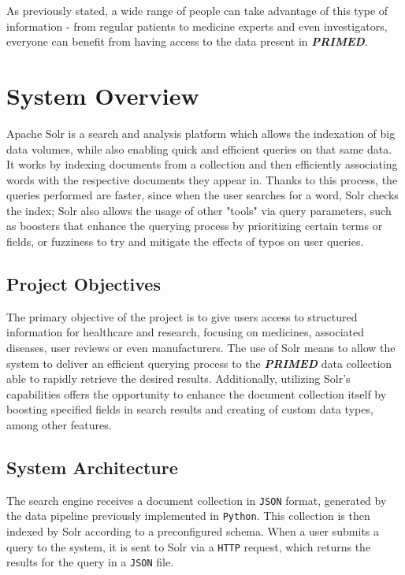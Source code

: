 \documentclass[sigconf]{acmart}
\begin{document}
As previously stated, a wide range of people can take advantage of this type of information - from regular patients to medicine experts and even investigators, everyone can benefit from having access to the data present in \textit{\textbf{PRIMED}}.

\section{System Overview}

Apache Solr\cite{solr} is a search and analysis platform which allows the indexation of big data volumes, while also enabling quick and efficient queries on that same data. It works by indexing documents from a collection and then efficiently associating words with the respective documents they appear in. Thanks to this process, the queries performed are faster, since when the user searches for a word, Solr checks the index; Solr also allows the usage of other "tools" via query parameters, such as boosters that enhance the querying process by prioritizing certain terms or fields, or fuzziness to try and mitigate the effects of typos on user queries.

\subsection{Project Objectives}

The primary objective of the project is to give users access to structured information for healthcare and research, focusing on medicines, associated diseases, user reviews or even manufacturers.
The use of Solr means to allow the system to deliver an efficient querying process to the \textit{\textbf{PRIMED}} data collection able to rapidly retrieve the desired results. 
Additionally, utilizing Solr's capabilities offers the opportunity to enhance the document collection itself by boosting specified fields in search results and creating of custom data types, among other features.

\subsection{System Architecture}

The search engine receives a document collection in \texttt{JSON} format, generated by the data pipeline previously implemented in \texttt{Python}. This collection is then indexed by Solr according to a preconfigured schema\cite{schema}. When a user submits a query to the system, it is sent to Solr via a \texttt{HTTP} request\cite{http}, which returns the results for the query in a \texttt{JSON} file.
\end{document}
